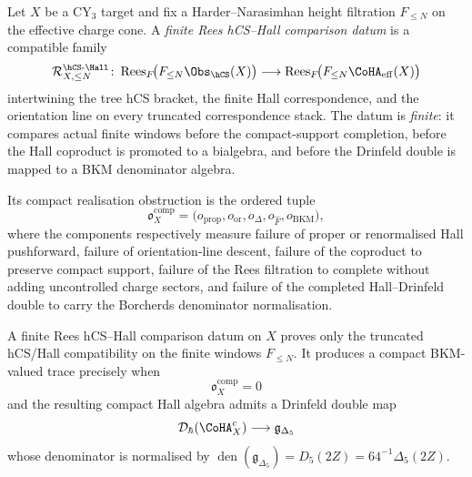\begin{definition}
\label{def:finite-rees-hcs-hall-datum}
Let $X$ be a CY$_3$ target and fix a Harder--Narasimhan height
filtration $F_{\le N}$ on the effective charge cone. A
\emph{finite Rees hCS--Hall comparison datum} is a compatible family
\[
 \mathcal R^{\hCS\text{-}\Hall}_{X,\le N}\colon
 \operatorname{Rees}_{F}\!\bigl(F_{\le N}\Obs_{\hCS}(X)\bigr)
 \longrightarrow
 \operatorname{Rees}_{F}\!\bigl(F_{\le N}\CoHA_{\mathrm{eff}}(X)\bigr)
\]
intertwining the tree hCS bracket, the finite Hall correspondence, and
the orientation line on every truncated correspondence stack. The datum
is \emph{finite}: it compares actual finite windows before the
compact-support completion, before the Hall coproduct is promoted to a
bialgebra, and before the Drinfeld double is mapped to a BKM
denominator algebra.

Its compact realisation obstruction is the ordered tuple
\[
 \mathfrak{o}^{\mathrm{comp}}_X
 =
 \bigl(o_{\mathrm{prop}},o_{\mathrm{or}},o_{\Delta},
 o_{\widehat{F}},o_{\mathrm{BKM}}\bigr),
\]
where the components respectively measure failure of proper or
renormalised Hall pushforward, failure of orientation-line descent,
failure of the coproduct to preserve compact support, failure of the
Rees filtration to complete without adding uncontrolled charge sectors,
and failure of the completed Hall--Drinfeld double to carry the
Borcherds denominator normalisation.
\end{definition}

\begin{proposition}
\label{prop:finite-rees-vs-compact-hall-double}
A finite Rees hCS--Hall comparison datum on \(X\) proves only the
truncated hCS/Hall compatibility on the finite windows \(F_{\le N}\).
It produces a compact BKM-valued trace precisely when
\[
 \mathfrak{o}^{\mathrm{comp}}_X=0
\]
and the resulting compact Hall algebra admits a Drinfeld double map
\[
 \mathcal D_{\hbar}\!\left(\CoHA_X^{c}\right)
 \longrightarrow
 \mathfrak g_{\Delta_5}
\]
whose denominator is normalised by
\(\operatorname{den}(\mathfrak g_{\Delta_5})=D_5(2Z)
=64^{-1}\Delta_5(2Z)\).
\end{proposition}

